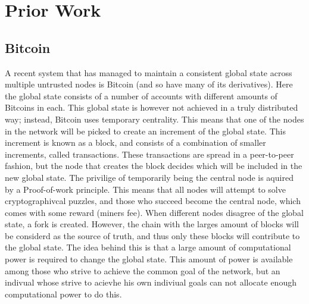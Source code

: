 \chapter{Prior Work}
\section{Bitcoin}
A recent system that has managed to maintain a consistent global state across multiple untrusted nodes is Bitcoin (and so have many of its derivatives). Here the global state consists of a number of accounts with different amounts of Bitcoins in each. This global state is however not achieved in a truly distributed way; instead, Bitcoin uses temporary centrality. This means that one of the nodes in the network will be picked to create an increment of the global state. This increment is known as a block, and consists of a combination of smaller increments, called transactions. These transactions are spread in a peer-to-peer fashion, but the node that creates the block decides which will be included in the new global state. The privilige of temporarily being the central node is aquired by a Proof-of-work principle. This means that all nodes will attempt to solve cryptographivcal puzzles, and those who succeed become the central node, which comes with some reward (miners fee). When different nodes disagree of the global state, a fork is created. However, the chain with the larges amount of blocks will be considerd as the source of truth, and thus only these blocks will contribute to the global state. The idea behind this is that a large amount of computational power is required to change the global state. This amount of power is available among those who strive to achieve the common goal of the network, but an indivual whose strive to acievhe his own indiviual goals can not allocate enough computational power to do this. 
